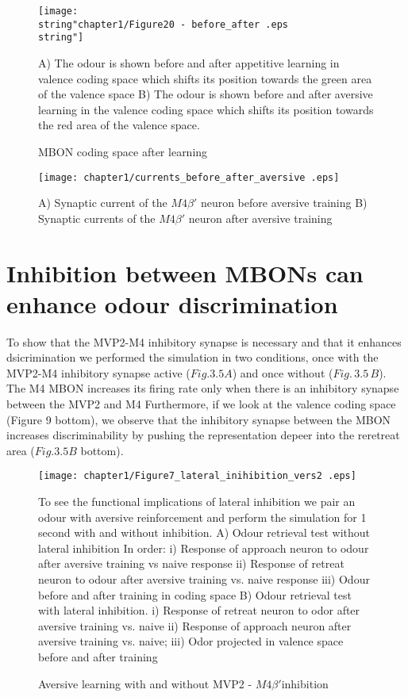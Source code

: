 \begin{figure}[H]
%
\texttt{[image: \\string"chapter1/Figure20 - before\_after
.eps\\string"]} {\caption[text to list of figures]{%
MBON coding space after learning %
}
}

A) The odour is shown before and after appetitive learning in valence
coding space which shifts its position towards the green area of the
valence space B) The odour is shown before and after aversive learning
in the valence coding space which shifts its position towards the
red area of the valence space. %
\end{figure}


\begin{figure}[H]
%
\texttt{[image: chapter1/currents\_before\_after\_aversive
.eps]} {\caption[text to list of figures]{%
%
}
}

A) Synaptic current of the $M4\beta'$ neuron before aversive training
B) Synaptic currents of the $M4\beta'$ neuron after aversive training%
\end{figure}

\section{Inhibition between MBONs can enhance odour discrimination}

To show that the MVP2-M4 inhibitory synapse is necessary and that
it enhances dsicrimination we performed the simulation in two conditions,
once with the MVP2-M4 inhibitory synapse active ($Fig.3.5A$) and
once without ($Fig.\,3.5\,B$). The M4 MBON increases its firing rate
only when there is an inhibitory synapse between the MVP2 and M4 Furthermore,
if we look at the valence coding space (Figure 9 bottom), we observe
that the inhibitory synapse between the MBON increases discriminability
by pushing the representation depeer into the reretreat area ($Fig.3.5B$
bottom). 


\begin{figure}[H]

\texttt{[image: chapter1/Figure7\_lateral\_inihibition\_vers2
.eps]} {\caption[text to list of figures]{%
 Aversive learning with and without MVP2 - $M4\beta'$inhibition%
}
}

To see the functional implications of lateral inhibition we pair an
odour with aversive reinforcement and perform the simulation for 1
second with and without inhibition. A) Odour retrieval test without
lateral inhibition In order: i) Response of approach neuron to odour
after aversive training vs naive response ii) Response of retreat
neuron to odour after aversive training vs. naive response iii) Odour
before and after training in coding space B) Odour retrieval test
with lateral inhibition. i) Response of retreat neuron to odor after
aversive training vs. naive ii) Response of approach neuron after
aversive training vs. naive; iii) Odor projected in valence space
before and after training %
\end{figure}

